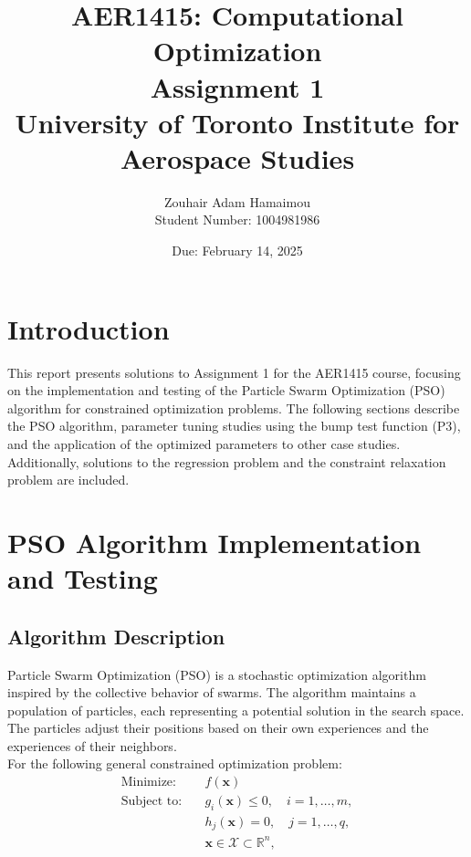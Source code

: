 \documentclass[12pt]{article}
\title{AER1415: Computational Optimization\\Assignment 1\\\vspace{0.4cm}\large \textbf{University of Toronto Institute for Aerospace Studies}}
\author{Zouhair Adam Hamaimou\\Student Number: 1004981986}
\date{Due: February 14, 2025}
\begin{document}
\maketitle

\tableofcontents
\newpage

\section{Introduction}
This report presents solutions to Assignment 1 for the AER1415 course, focusing on the implementation and testing of the Particle Swarm Optimization (PSO) algorithm for constrained optimization problems. The following sections describe the PSO algorithm, parameter tuning studies using the bump test function (P3), and the application of the optimized parameters to other case studies. Additionally, solutions to the regression problem and the constraint relaxation problem are included.

\section{PSO Algorithm Implementation and Testing}

\subsection{Algorithm Description}
Particle Swarm Optimization (PSO) is a stochastic optimization algorithm inspired by the collective behavior of swarms. The algorithm maintains a population of particles, each representing a potential solution in the search space. The particles adjust their positions based on their own experiences and the experiences of their neighbors.
\\
For the following general constrained optimization problem:
\begin{equation*}
    \begin{aligned}
        \text{Minimize:} \quad & f(\mathbf{x}) \\
        \text{Subject to:} \quad & g_i(\mathbf{x})  \leq 0, \quad i = 1, \dots, m, \\
        & h_j(\mathbf{x})  = 0, \quad j = 1, \dots, q, \\
        & \mathbf{x}  \in \mathcal{X} \subset \mathbb{R}^n,
    \end{aligned}
\end{equation*}
\end{document}
